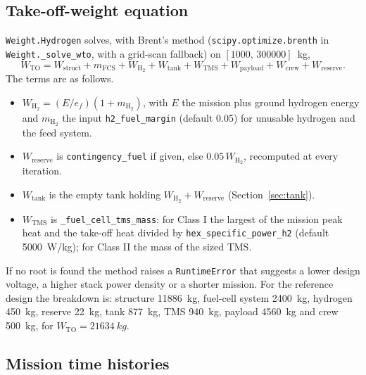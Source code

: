 \documentclass[a4paper,11pt]{article}
\newcommand{\code}[1]{\nolinkurl{#1}}
\newcommand{\fn}[1]{\nolinkurl{#1}}
\begin{document}
\subsection{Take-off-weight equation}

\fn{Weight.Hydrogen} solves, with Brent's method (\fn{scipy.optimize.brenth} in
\fn{Weight._solve_wto}, with a grid-scan fallback) on $[1000,\,300000]$~kg,
\begin{equation}
  W_\mathrm{TO} = W_\mathrm{struct} + m_\mathrm{FCS} + W_{\mathrm{H_2}} + W_\mathrm{tank}
  + W_\mathrm{TMS} + W_\mathrm{payload} + W_\mathrm{crew} + W_\mathrm{reserve}.
\end{equation}
The terms are as follows.
\begin{itemize}
  \item $W_{\mathrm{H_2}} = (E/e_f)(1+m_{\mathrm{H_2}})$, with $E$ the mission plus ground
  hydrogen energy and $m_{\mathrm{H_2}}$ the input \code{h2_fuel_margin} (default 0.05) for
  unusable hydrogen and the feed system.
  \item $W_\mathrm{reserve}$ is \code{contingency_fuel} if given, else
  $0.05\,W_{\mathrm{H_2}}$, recomputed at every iteration.
  \item $W_\mathrm{tank}$ is the empty tank holding $W_{\mathrm{H_2}}+W_\mathrm{reserve}$
  (Section~\ref{sec:tank}).
  \item $W_\mathrm{TMS}$ is \fn{_fuel_cell_tms_mass}: for Class I the largest of the mission
  peak heat and the take-off heat divided by \code{hex_specific_power_h2} (default
  \SI{5000}{W/kg}); for Class II the mass of the sized TMS.
\end{itemize}
If no root is found the method raises a \code{RuntimeError} that suggests a lower design
voltage, a higher stack power density or a shorter mission. For the reference design the
breakdown is: structure \SI{11886}{kg}, fuel-cell system \SI{2400}{kg}, hydrogen
\SI{450}{kg}, reserve \SI{22}{kg}, tank \SI{877}{kg}, TMS \SI{940}{kg}, payload \SI{4560}{kg}
and crew \SI{500}{kg}, for $W_\mathrm{TO}=\SI{21634}{kg}$.

\subsection{Mission time histories}
\label{sec:history}
\end{document}
